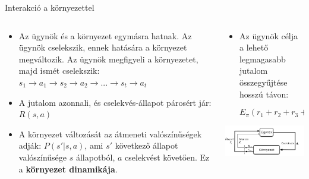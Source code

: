 \documentclass[english, aspectratio=169]{beamer}
\begin{document}
\begin{frame}{Interakció a környezettel}
\begin{columns}
\begin{column}{.5\textwidth}
\begin{itemize}
	\item Az ügynök és a környezet egymásra hatnak. Az ügynök cselekszik, ennek hatására a környezet megváltozik. Az ügynök megfigyeli a környezetet, majd ismét cselekszik:
	$s_1 \rightarrow a_1 \rightarrow s_2 \rightarrow a_2 \rightarrow ... \rightarrow s_t 			\rightarrow a_t$
	\item A jutalom azonnali, és cselekvés-állapot párosért jár: $R(s, a)$
	\item A környezet változását az átmeneti valószínűségek adják: $P(s'|s, a)$, ami $s'$ következő állapot valószínűsége $s$ állapotból, $a$ cselekvést követően. Ez a \textbf{környezet dinamikája}.
\end{itemize}
\end{column}
\begin{column}{.5\textwidth}
\begin{itemize}
	\item Az ügynök célja a lehető legmagasabb jutalom összegyűjtése hosszú távon: 
	\begin{block}{}
	\vspace{-0.2cm}
	\[
	E_{\pi}(r_{1}+r_{2}+r_{3}+...)\rightarrow{max}
	\]
	\end{block}		
\end{itemize}
\begin{center}
\includegraphics[width=7.5cm, keepaspectratio]{images/reinf_4.png}
\end{center}
\end{column}
\end{columns}
\end{frame}
\end{document}
